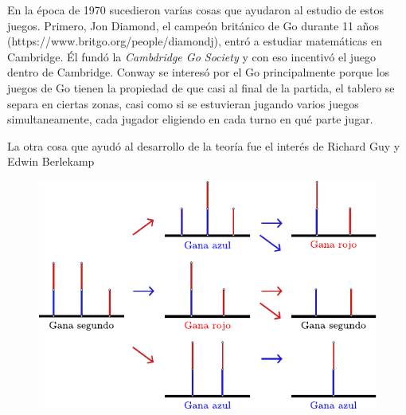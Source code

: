En la \'epoca de 1970 sucedieron var\'ias cosas que ayudaron al estudio de estos juegos. Primero, Jon Diamond, el campe\'on brit\'anico de Go durante 11 a\~nos \cite{}(https://www.britgo.org/people/diamondj), entr\'o a estudiar matem\'aticas en Cambridge. \'El fund\'o la \textit{Cambdridge Go Society} y con eso incentiv\'o el juego dentro de Cambridge.
Conway se interes\'o por el Go principalmente porque los juegos de Go tienen la propiedad de que casi al final de la partida, el tablero se separa en ciertas zonas, casi como si se estuvieran jugando varios juegos simultaneamente, cada jugador eligiendo en cada turno en qu\'e parte jugar.

La otra cosa que ayud\'o al desarrollo de la teor\'ia fue el inter\'es de Richard Guy y Edwin Berlekamp


\begin{figure}[h]
    \centering
    \includegraphics[width=.7\textwidth]{images/hackenbush-half_proof.pdf}
\end{figure}